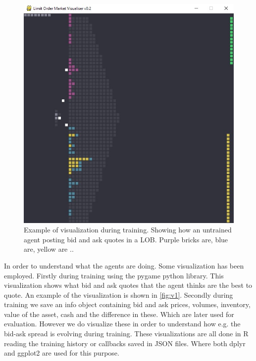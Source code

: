 \documentclass{kththesis}
\theoremstyle{definition}
\begin{document}
\begin{figure}[H]
    \centering
    \includegraphics[scale=.4]{Imgs/lob_untrained_Moment.jpg}
    \caption{Example of visualization during training. Showing how an untrained agent posting bid and ask quotes in a LOB. Purple bricks are, blue are, yellow are ..}
    \label{fig:v1}
\end{figure}

In order to understand what the agents are doing. Some visualization has been employed. Firstly during training using the pygame python library. This visualization shows what bid and ask quotes that the agent thinks are the best to quote. An example of the visualization is shown in \autoref{fig:v1}. 
\newline
\newline
Secondly during training we save an info object containing bid and ask prices, volumes, inventory, value of the asset, cash and the difference in these. Which are later used for evaluation. However we do visualize these in order to understand how e.g. the bid-ask spread is evolving during training. These visualizations are all done in R reading the training history or callbacks saved in JSON files. Where both dplyr \parencite{dplyr} and ggplot2 \parencite{ggfplot2} are used for this purpose.
\end{document}
